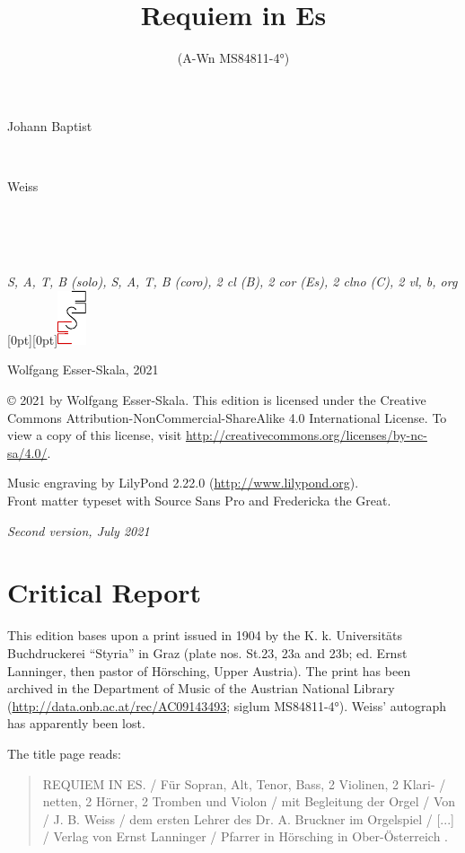 \documentclass[parskip=full]{scrreprt}
\makeatletter
\DeclareRobustCommand{\sbseries}{\fontseries{sb}\selectfont}
\newcommand\fancytitlehead{
  \headingfont%
  \fontsize{80}{80}\selectfont%
  \textcolor{black!80}{%
    \makebox[0pt][l]{\@ifundefined{@shortname}{\@lastname}{\@shortname}.}%
  }\\[15pt]%
  \fontsize{60}{60}\selectfont%
  \makebox[0pt][l]{\@ifundefined{@shorttitle}{\@title}{\@shorttitle}.}%
}
\def\firstname#1{\def\@firstname{#1}}
\def\lastname#1{\def\@lastname{#1}}
\def\shorttitle#1{\def\@shorttitle{#1}}
\def\scoring#1{\def\@scoring{#1}}
\def\maketitle{%
\begin{titlepage}%
  \Large%
  {\@titlehead}%
  \vfill%
  {\strut\@firstname}\\%
  {\sbseries\color{oldred}\strut\@lastname}\\%
  {\strut\@namesuffix}%
  \vfill%
  {\sbseries\@title}\\%
  {\@subtitle}\\[\baselineskip]%
  {\itshape\@scoring}%
  \vfill%
  {\itshape\@parts}\hspace*{\fill}\raisebox{0pt}[0pt][0pt]{\includegraphics{ees_logo}}%
\end{titlepage}%
}
\newif\ifprintreport\printreportfalse
\makeatother
\begin{document}
\frenchspacing

\titlehead{\fancytitlehead}
\firstname{Johann Baptist}
\lastname{Weiss}
\title{Requiem in Es}
\shorttitle{Requiem}
\subtitle{(A-Wn MS84811-4°)}
\scoring{S, A, T, B (solo), S, A, T, B (coro), 2 cl (B), 2 cor (Es), 2 clno (C), 2 vl, b, org}
\maketitle


\thispagestyle{empty}

\vspace*{\fill}

\hspace*{1em}Wolfgang Esser-Skala, 2021

© 2021 by Wolfgang Esser-Skala. This edition is licensed under the Creative Commons Attribution-NonCommercial-ShareAlike 4.0 International License. To view a copy of this license, visit \url{http://creativecommons.org/licenses/by-nc-sa/4.0/}.

Music engraving by LilyPond 2.22.0 (\url{http://www.lilypond.org}).\\
Front matter typeset with Source Sans Pro and Fredericka the Great.

\textit{Second version, July 2021}

\vspace*{2cm}

\ifprintreport
\chapter*{Critical Report}

This edition bases upon a print issued in 1904 by the K. k. Universitäts Buchdruckerei “Styria” in Graz (plate nos. St.23, 23a and 23b; ed. Ernst Lanninger, then pastor of Hörsching, Upper Austria). The print has been archived in the Department of Music of the Austrian National Library (\url{http://data.onb.ac.at/rec/AC09143493}; siglum MS84811-4°). Weiss’ autograph has apparently been lost.

The title page reads:
\begin{quote}
REQUIEM IN ES. / Für Sopran, Alt, Tenor, Bass, 2 Violinen, 2 Klari- / netten, 2 Hörner, 2 Tromben und Violon / mit Begleitung der Orgel / Von / J. B. Weiss / dem ersten Lehrer des Dr. A. Bruckner im Orgelspiel / [...] / Verlag von Ernst Lanninger / Pfarrer in Hörsching in Ober-Österreich .
\end{quote}
\end{document}
